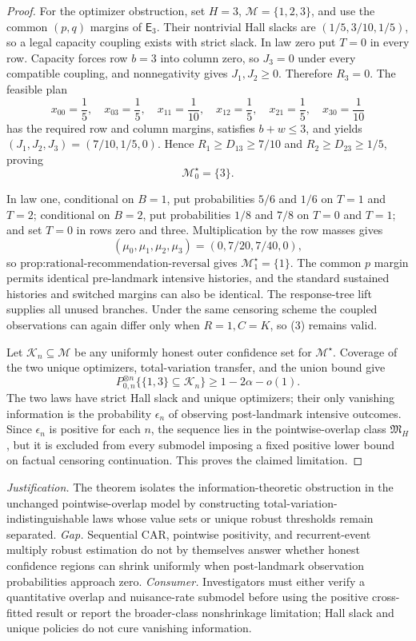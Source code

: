 \documentclass{article}
\begin{document}
\begin{proof}
For the optimizer obstruction, set \(H=3\), \(\mathcal M=\{1,2,3\}\), and use the common \((p,q)\) margins of \(\mathsf E_3\).  Their nontrivial Hall slacks are \((1/5,3/10,1/5)\), so a legal capacity coupling exists with strict slack.  In law zero put \(T=0\) in every row.  Capacity forces row \(b=3\) into column zero, so \(J_3=0\) under every compatible coupling, and nonnegativity gives \(J_1,J_2\ge0\).  Therefore \(R_3=0\).  The feasible plan
\[
 x_{00}=\frac15,\quad x_{03}=\frac15,\quad
 x_{11}=\frac1{10},\quad x_{12}=\frac15,\quad
 x_{21}=\frac15,\quad x_{30}=\frac1{10}                  \tag{6}
\]
has the required row and column margins, satisfies \(b+w\le3\), and yields
\((J_1,J_2,J_3)=(7/10,1/5,0)\).  Hence
\(R_1\ge D_{13}\ge7/10\) and \(R_2\ge D_{23}\ge1/5\), proving
\[
 \mathcal M^\star_0=\{3\}.                               \tag{7}
\]

In law one, conditional on \(B=1\), put probabilities \(5/6\) and \(1/6\) on \(T=1\) and \(T=2\); conditional on \(B=2\), put probabilities \(1/8\) and \(7/8\) on \(T=0\) and \(T=1\); and set \(T=0\) in rows zero and three.  Multiplication by the row masses gives
\[
 (\mu_0,\mu_1,\mu_2,\mu_3)=(0,7/20,7/40,0),              \tag{8}
\]
so \(\text{prop:rational-recommendation-reversal}\) gives
\(\mathcal M^\star_1=\{1\}\).  The common \(p\) margin permits identical pre-landmark intensive histories, and the standard sustained histories and switched margins can also be identical.  The response-tree lift supplies all unused branches.  Under the same censoring scheme the coupled observations can again differ only when \(R=1,C=K\), so (3) remains valid.

Let \(\mathcal K_n\subseteq\mathcal M\) be any uniformly honest outer confidence set for \(\mathcal M^\star\).  Coverage of the two unique optimizers, total-variation transfer, and the union bound give
\[
 P_{0,n}^{\otimes n}\{\{1,3\}\subseteq\mathcal K_n\}
 \ge1-2\alpha-o(1).                                      \tag{9}
\]
The two laws have strict Hall slack and unique optimizers; their only vanishing information is the probability \(\epsilon_n\) of observing post-landmark intensive outcomes.  Since \(\epsilon_n\) is positive for each \(n\), the sequence lies in the pointwise-overlap class \(\mathfrak M_H\), but it is excluded from every submodel imposing a fixed positive lower bound on factual censoring continuation.  This proves the claimed limitation.
\end{proof}
\par\smallskip\noindent \textit{Justification.} The theorem isolates the information-theoretic obstruction in the unchanged pointwise-overlap model by constructing total-variation-indistinguishable laws whose value sets or unique robust thresholds remain separated. \textit{Gap.} Sequential CAR, pointwise positivity, and recurrent-event multiply robust estimation do not by themselves answer whether honest confidence regions can shrink uniformly when post-landmark observation probabilities approach zero. \textit{Consumer.} Investigators must either verify a quantitative overlap and nuisance-rate submodel before using the positive cross-fitted result or report the broader-class nonshrinkage limitation; Hall slack and unique policies do not cure vanishing information.
\end{document}
